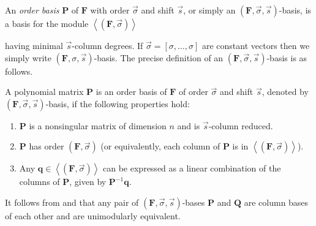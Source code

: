 An \emph{order basis} \citep{BeLa94,BL1997} $\mathbf{P}$ of $\mathbf{F}$
with order $\vec{\sigma}$ and shift $\vec{s}$, or simply an $\left(\mathbf{F},\vec{\sigma},\vec{s}\right)$-basis,
is a basis for the module $\left\langle \left(\mathbf{F},\vec{\sigma}\right)\right\rangle $
\begin{comment}
\[
\left\langle \left(\mathbf{F},\vec{\sigma}\right)\right\rangle =\{\mathbf{p}\in\mathbb{K}\left[x\right]^{n\times1}\|\mathbf{F}\cdot\mathbf{p}=x^{\vec{\sigma}}\mathbf{r},\mathbf{r}\in\mathbb{K}[[x]]^{m\times1}\}
\]
\end{comment}
{} having minimal $\vec{s}$-column degrees. If $\vec{\sigma}=\left[\sigma,\dots,\sigma\right]$
are constant vectors then we simply write $\left(\mathbf{F},\sigma,\vec{s}\right)$-basis.
The precise definition of an $\left(\mathbf{F},\vec{\sigma},\vec{s}\right)$-basis
is as follows.
\begin{defn}
\label{def:orderBasis}A polynomial matrix $\mathbf{P}$ is an order
basis of $\mathbf{F}$ of order $\vec{\sigma}$ and shift $\vec{s}$,
denoted by $\left(\mathbf{F},\vec{\sigma},\vec{s}\right)$-basis,
if the following properties hold: 
\begin{enumerate}
\item $\mathbf{P}$ is a nonsingular matrix of dimension $n$ and is $\vec{s}$-column
reduced. 
\item $\mathbf{P}$ has order $\left(\mathbf{F},\vec{\sigma}\right)$ (or
equivalently, each column of $\mathbf{P}$ is in $\left\langle (\mathbf{F},\vec{\sigma})\right\rangle $). 
\item Any $\mathbf{q}\in\left\langle \left(\mathbf{F},\vec{\sigma}\right)\right\rangle $
can be expressed as a linear combination of the columns of $\mathbf{P}$,
given by $\mathbf{P}^{-1}\mathbf{q}$. 
\end{enumerate}
\end{defn}
\begin{comment}
Note that the module $\left\langle \left(\mathbf{F},\vec{\sigma}\right)\right\rangle $
does not depend on the shift $\vec{s}$. 
\end{comment}




It follows from  and 
that any pair of $\left(\mathbf{F},\vec{\sigma},\vec{s}\right)$-bases
$\mathbf{P}$ and $\mathbf{Q}$ are column bases of each other and
are unimodularly equivalent.

